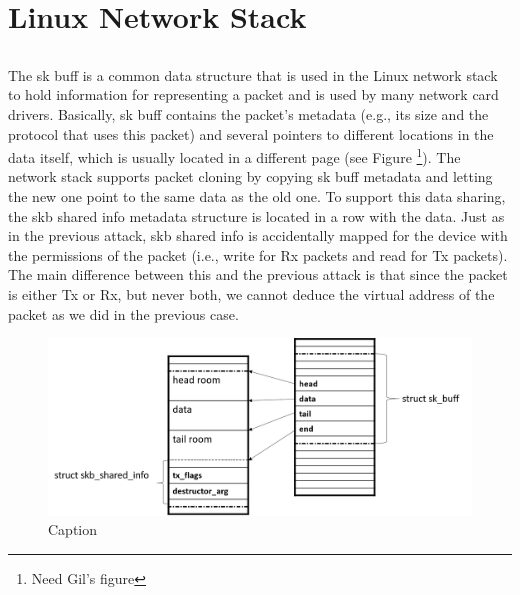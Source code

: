 \section{Linux Network Stack}

\subsection{\shinfo}
The sk buff is a common data structure that is used in the Linux network stack to
hold information for representing a packet and is used by many network card drivers.
Basically, sk buff contains the packet’s metadata (e.g., its size and the protocol that
uses this packet) and several pointers to different locations in the data itself, which is usually located in a different page (see Figure \footnote{Need Gil's figure}). The network stack supports packet
cloning by copying sk buff metadata and letting the new one point to the same data
as the old one. To support this data sharing, the skb shared info metadata structure
is located in a row with the data. Just as in the previous attack, skb shared info is
accidentally mapped for the device with the permissions of the packet (i.e., write for Rx
packets and read for Tx packets).
The main difference between this and the previous attack is that since the packet is
either Tx or Rx, but never both, we cannot deduce the virtual address of the packet as we did in the previous case.
\begin{figure}
    \centering
    \includegraphics[width=1\linewidth]{figs/skb.png}
    \caption{Caption}
    \label{fig:sh_info}
\end{figure}
